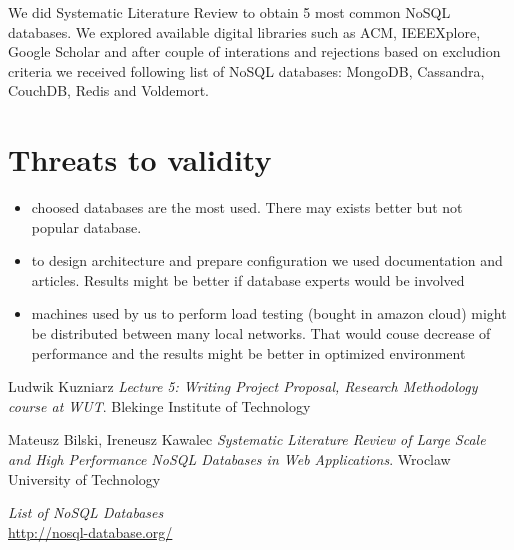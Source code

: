 \documentclass[times, 10pt,twocolumn]{article}
\newcounter{firstbib}
\begin{document}
	We did Systematic Literature Review \cite{slr} to obtain 5 most common
	NoSQL databases. We explored available digital libraries such as ACM, IEEEXplore,
	Google Scholar and after couple of interations and rejections based on
	excludion criteria we received following list of NoSQL databases: MongoDB, Cassandra, CouchDB, Redis and Voldemort.  

\section{Threats to validity}

\begin{itemize}
	\item choosed databases are the most used. There may exists better but not popular database.
	\item to design architecture and prepare configuration we used documentation and articles. Results might be better if database experts would be involved
	\item machines used by us to perform load testing (bought in amazon cloud) might be distributed between many local networks. That would 
	couse decrease of performance and the results might be better in optimized environment
\end{itemize}

\begin{thebibliography}{9}  

\setcounter{enumiv}{\value{firstbib}}
      
      Ludwik Kuzniarz
      \emph{Lecture 5: Writing Project Proposal, Research Methodology course at WUT}. Blekinge Institute of Technology
      
      Mateusz Bilski, Ireneusz Kawalec
      \emph{Systematic Literature Review of Large Scale and High Performance NoSQL Databases in Web Applications}. Wroclaw University of Technology
      
      \emph{List of NoSQL Databases} \\
      \url{http://nosql-database.org/}

\end{thebibliography}
\end{document}
